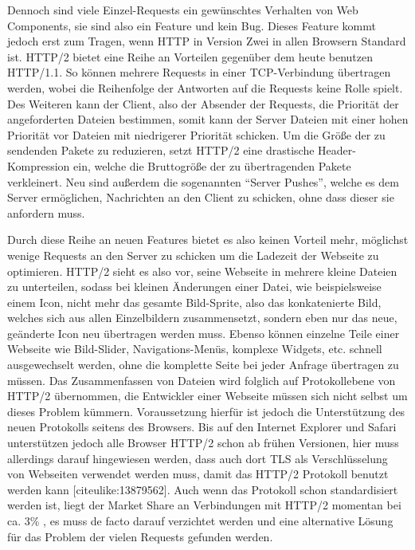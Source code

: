 Dennoch sind viele Einzel-Requests ein gewünschtes Verhalten von Web Components, sie sind also ein Feature und kein Bug. Dieses Feature kommt jedoch erst zum Tragen, wenn \ac{HTTP} in Version Zwei in allen Browsern Standard ist. \ac{HTTP}/2 bietet eine Reihe an Vorteilen gegenüber dem heute benutzen \ac{HTTP}/1.1. So können mehrere Requests in einer \ac{TCP}-Verbindung übertragen werden, wobei die Reihenfolge der Antworten auf die Requests keine Rolle spielt. Des Weiteren kann der Client, also der Absender der Requests, die Priorität der angeforderten Dateien bestimmen, somit kann der Server Dateien mit einer hohen Priorität vor Dateien mit niedrigerer Priorität schicken. Um die Größe der zu sendenden Pakete zu reduzieren, setzt \ac{HTTP}/2 eine drastische Header-Kompression ein, welche die Bruttogröße der zu übertragenden Pakete verkleinert. Neu sind außerdem die sogenannten ``Server Pushes'', welche es dem Server ermöglichen, Nachrichten an den Client zu schicken, ohne dass dieser sie anfordern muss.

Durch diese Reihe an neuen Features bietet es also keinen Vorteil mehr, möglichst wenige Requests an den Server zu schicken um die Ladezeit der Webseite zu optimieren. \ac{HTTP}/2 sieht es also vor, seine Webseite in mehrere kleine Dateien zu unterteilen, sodass bei kleinen Änderungen einer Datei, wie beispielsweise einem Icon, nicht mehr das gesamte Bild-Sprite, also das konkatenierte Bild, welches sich aus allen Einzelbildern zusammensetzt, sondern eben nur das neue, geänderte Icon neu übertragen werden muss. Ebenso können einzelne Teile einer Webseite wie Bild-Slider, Navigations-Menüs, komplexe Widgets, etc. schnell ausgewechselt werden, ohne die komplette Seite bei jeder Anfrage übertragen zu müssen. Das Zusammenfassen von Dateien wird folglich auf Protokollebene von \ac{HTTP}/2 übernommen, die Entwickler einer Webseite müssen sich nicht selbst um dieses Problem kümmern. Voraussetzung hierfür ist jedoch die Unterstützung des neuen Protokolls seitens des Browsers. Bis auf den Internet Explorer und Safari unterstützen jedoch alle Browser \ac{HTTP}/2 schon ab frühen Versionen, hier muss allerdings darauf hingewiesen werden, dass auch dort \ac{TLS} als Verschlüsselung von Webseiten verwendet werden muss, damit das \ac{HTTP}/2 Protokoll benutzt werden kann [citeulike:13879562]. Auch wenn das Protokoll schon standardisiert werden ist, liegt der Market Share an Verbindungen mit \ac{HTTP}/2 momentan bei ca. 3\% \cite{citeulike:13879575}, es muss de facto darauf verzichtet werden und eine alternative Lösung für das Problem der vielen Requests gefunden werden.


